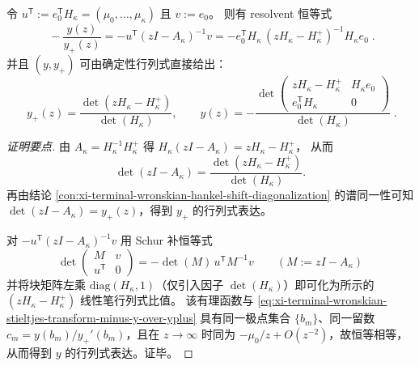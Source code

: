 \begin{conclusion}\label{con:xi-terminal-wronskian-hankel-determinantal-reconstruction}
令 \(u^{\mathsf T}:=e_0^{\mathsf T}H_{\kappa}=(\mu_0,\dots,\mu_\kappa)\) 且 \(v:=e_0\)。
则有 resolvent 恒等式
\[
\boxed{\;
-\frac{y(z)}{y_{+}(z)}=-u^{\mathsf T}(zI-A_{\kappa})^{-1}v
=-e_0^{\mathsf T}H_{\kappa}\,(zH_{\kappa}-H_{\kappa}^{+})^{-1}H_{\kappa}e_0\; }.
\]
并且 \((y,y_{+})\) 可由确定性行列式直接给出：
\[
\boxed{\;
y_{+}(z)=\frac{\det(zH_{\kappa}-H_{\kappa}^{+})}{\det(H_{\kappa})},
\qquad
y(z)=-\frac{\det\!\begin{pmatrix}
zH_{\kappa}-H_{\kappa}^{+} & H_{\kappa}e_0\\
e_0^{\mathsf T}H_{\kappa} & 0
\end{pmatrix}}{\det(H_{\kappa})}\; }.
\]
\end{conclusion}
\begin{proof}[证明要点]
由 \(A_{\kappa}=H_{\kappa}^{-1}H_{\kappa}^{+}\) 得
\(
H_{\kappa}(zI-A_{\kappa})=zH_{\kappa}-H_{\kappa}^{+}
\)，
从而
\[
\det(zI-A_{\kappa})=\frac{\det(zH_{\kappa}-H_{\kappa}^{+})}{\det(H_{\kappa})}.
\]
再由结论 \ref{con:xi-terminal-wronskian-hankel-shift-diagonalization} 的谱同一性可知 \(\det(zI-A_{\kappa})=y_{+}(z)\)，得到 \(y_{+}\) 的行列式表达。
\par
对 \(-u^{\mathsf T}(zI-A_{\kappa})^{-1}v\) 用 Schur 补恒等式
\[
\det\!\begin{pmatrix} M & v\\ u^{\mathsf T} & 0\end{pmatrix}
=-\det(M)\,u^{\mathsf T}M^{-1}v\qquad(M:=zI-A_{\kappa})
\]
并将块矩阵左乘 \(\mathrm{diag}(H_{\kappa},1)\)（仅引入因子 \(\det(H_{\kappa})\)）即可化为所示的 \((zH_{\kappa}-H_{\kappa}^{+})\) 线性笔行列式比值。
该有理函数与 \eqref{eq:xi-terminal-wronskian-stieltjes-transform-minus-y-over-yplus} 具有同一极点集合 \(\{b_m\}\)、同一留数 \(c_m=y(b_m)/y_{+}'(b_m)\)，且在 \(z\to\infty\) 时同为 \(-\mu_0/z+O(z^{-2})\)，故恒等相等，从而得到 \(y\) 的行列式表达。证毕。
\end{proof}

